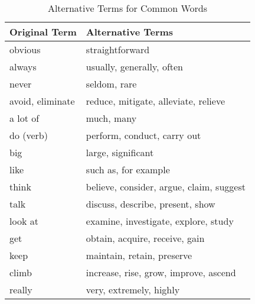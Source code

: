 \begin{table}[ht]
	\centering
	\begin{tabular}{@{}ll@{}}
		\toprule
		Original Term    & Alternative Terms                        \\
		\midrule
		obvious          & straightforward                          \\
		always           & usually, generally, often                \\
		never            & seldom, rare                             \\
		avoid, eliminate & reduce, mitigate, alleviate, relieve     \\
		a lot of         & much, many                               \\
		do (verb)        & perform, conduct, carry out              \\
		big              & large, significant                       \\
		like             & such as, for example                     \\
		think            & believe, consider, argue, claim, suggest \\
		talk             & discuss, describe, present, show         \\
		look at          & examine, investigate, explore, study     \\
		get              & obtain, acquire, receive, gain           \\
		keep             & maintain, retain, preserve               \\
		climb            & increase, rise, grow, improve, ascend    \\
		really           & very, extremely, highly                  \\
		\bottomrule
	\end{tabular}
	\caption{Alternative Terms for Common Words}
	\label{tab:alternative_terms}
\end{table}


